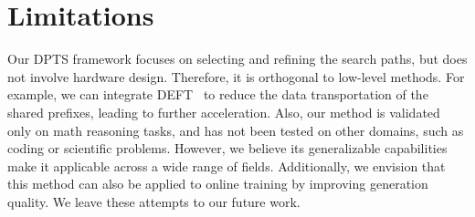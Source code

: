 \newpage 
\section*{Limitations}







Our DPTS framework focuses on selecting and refining the search paths, but does not involve hardware design. Therefore, it is orthogonal to low-level methods. For example, we can integrate DEFT~\cite{yao2024deft} to reduce the data transportation of the shared prefixes, leading to further acceleration. 
Also, our method is validated only on math reasoning tasks, and has not been tested on other domains, such as coding or scientific problems. However, we believe its generalizable capabilities make it applicable across a wide range of fields. 
Additionally, we envision that this method can also be applied to online training by improving generation quality. We leave these attempts to our future work. 




